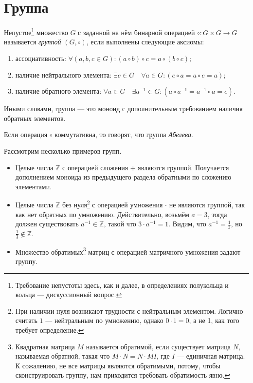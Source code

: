 \section{Группа}

\begin{definition}
Непустое\footnote{Требование непустоты здесь, как и далее, в определениях полукольца и кольца --- дискуссионный вопрос.} множество $G$ с заданной на нём бинарной операцией $\circ: {G} \times {G} \to {G}$ называется \emph{группой} $(G ,\circ)$, если выполнены следующие аксиомы:
\begin{enumerate}
\item ассоциативность: $\forall (a,b,c\in G)\colon (a\circ b)\circ c = a\circ (b \circ c)$;
\item наличие нейтрального элемента: $ \exists e \in G \quad \forall a\in G\colon (e \circ a = a \circ e = a)$;
\item наличие обратного элемента: $ \forall a\in G\quad \exists a^{-1}\in G\colon (a \circ a^{-1}=a^{-1} \circ a = e)$.
\end{enumerate}

Иными словами, группа --- это моноид с дополнительным требованием наличия обратных элементов.
\end{definition}

\begin{definition}
Если операция $\circ$ коммутативна, то говорят, что группа \textit{Абелева}.
\end{definition}

\begin{example}
Рассмотрим несколько примеров групп.
\begin{itemize}
	\item Целые числа $\mathbb{Z}$ с операцией сложения $+$ являются группой. Получается дополнением моноида из предыдущего раздела обратными по сложению элементами. 
	\item Целые числа $\mathbb{Z}$ без нуля\footnote{При наличии нуля возникают трудности с нейтральным элементом. Логично считать $1$ --- нейтральным по умножению, однако $0\cdot1 = 0$, а не 1, как того требует определение.} с операцией умножения $\cdot$ не являются группой, так как нет обратных по умножению. Действительно, возьмём $a = 3$, тогда должен существовать $a^{-1} \in \mathbb{Z}$, такой что $3 \cdot a^{-1} = 1$. Видим, что $a^{-1} = \frac{1}{3}$, но $\frac{1}{3} \notin \mathbb{Z}$.
	\item Множество обратимых\footnote{Квадратная матрица $M$ называется обратимой, если существует матрица $N$, называемая обратной, такая что $M \cdot N = N \cdot M I$, где $I$ --- единичная матрица. К сожалению, не все матрицы являются обратимыми, потому, чтобы сконструировать группу, нам приходится требовать обратимость явно.} матриц с операцией матричного умножения задают группу.
\end{itemize}
\end{example}


